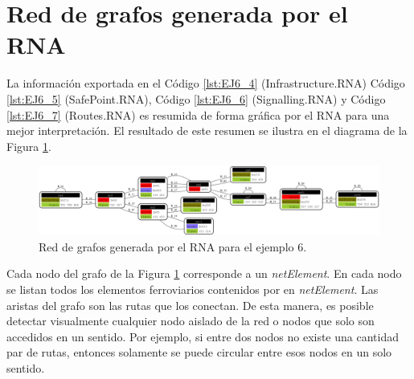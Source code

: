 \section{Red de grafos generada por el RNA}

	La información exportada en el Código \ref{lst:EJ6_4} (Infrastructure.RNA) Código \ref{lst:EJ6_5} (SafePoint.RNA), Código \ref{lst:EJ6_6} (Signalling.RNA) y Código \ref{lst:EJ6_7} (Routes.RNA) es resumida de forma gráfica por el RNA para una mejor interpretación. El resultado de este resumen se ilustra en el diagrama de la Figura \ref{fig:EJ6_8}.
	
	\begin{figure}[H]
		\centering
		\includegraphics[origin = c, width=\textwidth]{Figuras/Graph_6}
		\centering\caption{Red de grafos generada por el RNA para el ejemplo 6.}
		\label{fig:EJ6_8}
	\end{figure}
	
	Cada nodo del grafo de la Figura \ref{fig:EJ6_8} corresponde a un \textit{netElement}. En cada nodo se listan todos los elementos ferroviarios contenidos por en \textit{netElement}. Las aristas del grafo son las rutas que los conectan. De esta manera, es posible detectar visualmente cualquier nodo aislado de la red o nodos que solo son accedidos en un sentido. Por ejemplo, si entre dos nodos no existe una cantidad par de rutas, entonces solamente se puede circular entre esos nodos en un solo sentido.